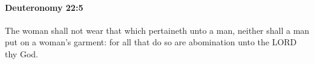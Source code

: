
		\paragraph{Deuteronomy 22:5} %
			\label{DEUTERONOMY-22-5}

			The woman shall not wear that which pertaineth unto a man, neither shall a man put on a woman's garment: for all that do so are abomination unto the LORD thy God.


